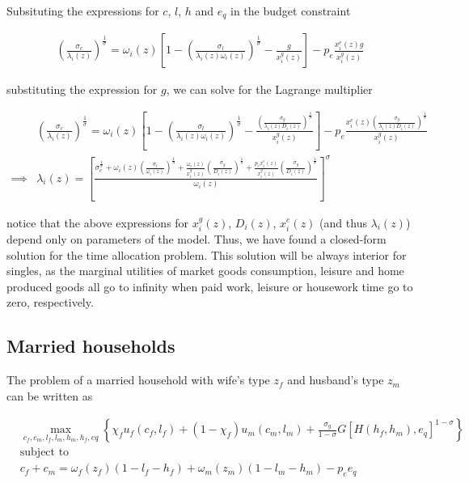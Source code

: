 \documentclass[12pt]{article}
\begin{document}
Subsituting the expressions for $c$, $l$, $h$ and $e_q$ in the budget constraint

\begin{align*}
	\left(\frac{\sigma_c}{\lambda_i(z)}\right)^{\frac{1}{\sigma}}=\omega_i\left(z\right)\left[1-\left(\frac{\sigma_l}{\lambda_i(z)\omega_i(z)}\right)^{\frac{1}{\sigma}}-\frac{g}{x_i^g(z)}\right]-p_e\frac{x_i^e(z) g}{x_i^g(z)}
\end{align*}

substituting the expression for $g$, we can solve for the Lagrange multiplier

\begin{align*}
	& \left(\frac{\sigma_c}{\lambda_i(z)}\right)^{\frac{1}{\sigma}}=\omega_i\left(z\right)\left[1-\left(\frac{\sigma_l}{\lambda_i(z)\omega_i(z)}\right)^{\frac{1}{\sigma}}-\frac{\left(\frac{\sigma_g}{\lambda_i(z) D_i(z)}\right)^{\frac{1}{\sigma}}}{x_i^g(z)}\right]-p_e\frac{x_i^e(z) \left(\frac{\sigma_g}{\lambda_i(z) D_i(z)}\right)^{\frac{1}{\sigma}}}{x_i^g(z)} \\
	\implies & \lambda_i(z) = \left[\frac{\sigma_c^{\frac{1}{\sigma}}+\omega_i\left(z\right)\left(\frac{\sigma_l}{\omega_i(z)}\right)^{\frac{1}{\sigma}}+\frac{\omega_i\left(z\right)}{x_i^g(z)}\left(\frac{\sigma_g}{D_i(z)}\right)^{\frac{1}{\sigma}}+\frac{p_e x_i^e(z)}{x_i^g(z)}\left(\frac{\sigma_g}{D_i(z)}\right)^{\frac{1}{\sigma}}}{\omega_i(z)}\right]^\sigma
\end{align*}

notice that the above expressions for $x_i^g(z)$, $D_i(z)$, $x_i^e(z)$ (and thus $\lambda_i(z)$) depend only on parameters of the model. Thus, we have found a closed-form solution for the time allocation problem. This solution will be always interior for singles, as the marginal utilities of market goods consumption, leisure and home produced goods all go to infinity when paid work, leisure or housework time go to zero, respectively.

\subsection*{Married households}

The problem of a married household  with wife's type $z_f$ and husband's type $z_m$ can be written as

\begin{align*}
	& \max_{c_f,c_m,l_f,l_m,h_m,h_f,eq} \left\lbrace \chi_fu_f\left(c_f,l_f\right)+ \left(1-\chi_f\right)u_m\left(c_m,l_m\right)+\frac{\sigma_g}{1-\sigma}G\left[H\left(h_f,h_m\right),e_q\right]^{1-\sigma}\right\rbrace \\
	&\text{subject to} \\
	& c_f+c_m = \omega_f(z_f)\left(1-l_f-h_f\right)+\omega_m(z_m)\left(1-l_m-h_m\right)-p_e e_q
\end{align*}
\end{document}
